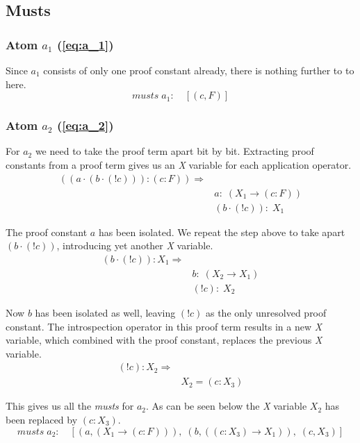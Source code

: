 \subsection{Musts}
\subsubsection[First atom]{Atom $a_1$ (\ref{eq:a_1})}
Since $a_1$ consists of only one proof constant already, there is nothing further to to here.
\begin{equation}
	musts \; a_1:\quad  [(c, F)]
\end{equation}
\subsubsection[Second atom]{Atom $a_2$ (\ref{eq:a_2})}
For $a_2$ we need to take the proof term apart bit by bit. Extracting proof constants from a proof term gives us an \emph{X} variable for each application operator. 
\begin{align}\label{eq:musts1_a_2}
		((a \cdot(b\cdot (! c))):(c:F)) \Rightarrow \nonumber\\
		 & a : \; (X_1 \rightarrow (c:F)) \nonumber\\
		 & (b\cdot(! c)): \; X_1
\end{align}

The proof constant $a$ has been isolated. We repeat the step above to take apart $(b\cdot(! c))$, introducing yet another \emph{X} variable.
\begin{align}
	(b\cdot(! c)): X_1 \Rightarrow  \nonumber\\
	& b : \; (X_2 \rightarrow X_1) \nonumber\\
	& (! c) :\;  X_2
\end{align}

Now $b$ has been isolated as well, leaving $(! c)$ as the only unresolved proof constant. The introspection operator in this proof term results in a new \emph{X} variable, which combined with the proof constant, replaces the previous \emph{X} variable.
\begin{equation*}
	\begin{split}
		(! c) : X_2 \Rightarrow \\
		& X_2 = (c:X_3)
	\end{split}	
\end{equation*}

This gives us all the \emph{musts} for $a_2$. As can be seen below the \emph{X} variable $X_2$ has been replaced by $(c:X_3)$.
\begin{equation}\label{eq:a2_musts}
	musts \; a_2: \quad [(a, (X_1 \rightarrow (c:F))), \;(b, ((c:X_3) \rightarrow X_1)),\; (c, X_3)]
\end{equation}


